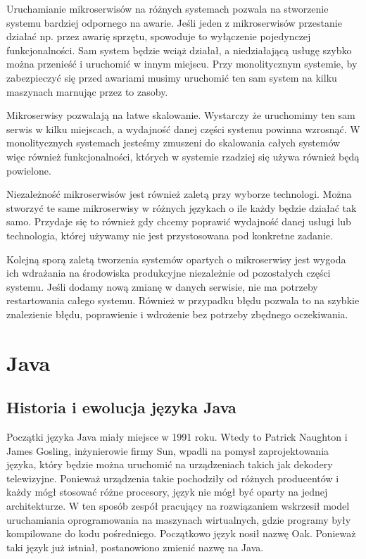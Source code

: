  Uruchamianie mikroserwisów na różnych systemach pozwala na stworzenie systemu bardziej odpornego na awarie. Jeśli jeden z mikroserwisów przestanie działać np. przez awarię sprzętu, spowoduje to wyłączenie pojedynczej funkcjonalności. Sam system będzie wciąż działał, a niedziałającą usługę szybko można przenieść i uruchomić w innym miejscu. Przy monolitycznym systemie, by zabezpieczyć się przed awariami musimy uruchomić ten sam system na kilku maszynach marnując przez to zasoby.

Mikroserwisy pozwalają na łatwe skalowanie. Wystarczy że uruchomimy ten sam serwis w kilku miejscach, a wydajność danej części systemu powinna wzrosnąć. W monolitycznych systemach jesteśmy zmuszeni do skalowania całych systemów więc również funkcjonalności, których w systemie rzadziej się używa również będą powielone.

Niezależność mikroserwisów jest również zaletą przy wyborze technologi. Można stworzyć te same mikroserwisy w różnych językach o ile każdy będzie działać tak samo. Przydaje się to również gdy chcemy poprawić wydajność danej usługi lub technologia, której używamy nie jest przystosowana pod konkretne zadanie. 

Kolejną sporą zaletą tworzenia systemów opartych o mikroserwisy jest wygoda ich wdrażania na środowiska produkcyjne niezależnie od pozostałych części systemu. Jeśli dodamy nową zmianę w danych serwisie, nie ma potrzeby restartowania całego systemu. Również w przypadku błędu pozwala to na szybkie znalezienie błędu, poprawienie i wdrożenie bez potrzeby zbędnego oczekiwania. 

\section{Java}
\subsection{Historia i ewolucja języka Java}
Początki języka Java miały miejsce w 1991 roku. Wtedy to Patrick Naughton i James Gosling, inżynierowie firmy Sun,  wpadli na pomysł zaprojektowania języka, który będzie można uruchomić na urządzeniach takich jak dekodery telewizyjne\cite{java8}. Ponieważ urządzenia takie pochodziły od różnych producentów i każdy mógł stosować różne procesory, język nie mógł być oparty na jednej architekturze. W ten sposób zespół pracujący na rozwiązaniem wskrzesił model uruchamiania oprogramowania na maszynach wirtualnych, gdzie programy były kompilowane do kodu pośredniego.  
Początkowo język nosił nazwę Oak. Ponieważ taki język już istniał, postanowiono zmienić nazwę na Java.

